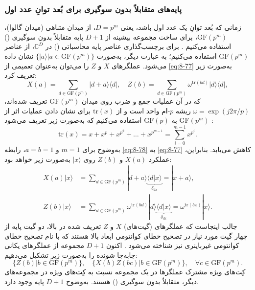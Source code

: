 \subsubsection{پایه‌های متقابلاً بدون سوگیری برای بُعد توانِ عدد اول}
\label{subsec:8-4-1-4}
زمانی که بُعد توانِ یک عدد اول باشد، یعنی $D = p^m$، از میدان متناهی (میدان گالوا)، $\mathrm{GF}(p^m)$، برای ساخت مجموعه بیشینه از $D + 1$ پایه متقابلاً بدون سوگیری () استفاده می‌کنیم \cite{8-78, 8-83, 8-84}. برای برچسب‌گذاری عناصر پایه محاسباتی () در $\mathbb{C}^D$، از عناصر $\mathrm{GF}(p^m)$ استفاده می‌کنیم؛ به عبارت دیگر،  به‌صورت $\{|a\rangle | a \in \mathrm{GF}(p^m)\}$ نشان داده می‌شود. عملگرهای $X$ و $Z$ را می‌توان به‌عنوان تعمیمی از \eqref{eq:8-77} به‌صورت زیر تعریف کرد:
\begin{equation}
	X(a) = \sum_{d \in \mathrm{GF}(p^m)} |d+a\rangle \langle d|, \quad Z(b) = \sum_{d \in \mathrm{GF}(p^m)} \omega^{\text{tr}(bd)} |d\rangle \langle d|,
	\label{eq:8-78}
\end{equation}
که در آن عملیات جمع و ضرب روی میدان $\mathrm{GF}(p^m)$ تعریف شده‌اند، $\omega = \exp(j2\pi/p)$ ریشه $p$-ام واحد است و از $\text{tr}(x)$ برای نشان دادن عملیات اثر از $\mathrm{GF}(p^m)$ به $\mathrm{GF}(p)$ استفاده می‌کنیم که به‌صورت زیر تعریف می‌شود \cite{8-5}:
\begin{equation}
	\text{tr}(x) = x + x^p + x^{p^2} + \dots + x^{p^{m-1}} = \sum_{i=0}^{m-1} x^{p^i}.
	\label{eq:8-79}
\end{equation}
به‌وضوح برای $m = 1$ و $a = b = 1$، رابطه \eqref{eq:8-78} به \eqref{eq:8-77} کاهش می‌یابد. بنابراین، عملکرد $X(a)$ و $Z(b)$ روی $|x\rangle$ به‌صورت زیر خواهد بود:
\begin{equation}
	\begin{aligned}
		X(a)|x\rangle &= \sum_{d \in \mathrm{GF}(p^m)} |d+a\rangle \underbrace{\langle d|x\rangle}_{\delta_{dx}} = |x+a\rangle, \\
		Z(b)|x\rangle &= \sum_{d \in \mathrm{GF}(p^m)} \omega^{\text{tr}(bd)} |d\rangle \underbrace{\langle d|x\rangle}_{\delta_{dx}} = \omega^{\text{tr}(bx)} |x\rangle.
	\end{aligned}
	\label{eq:8-80}
\end{equation}
جالب اینجاست که عملگرهای (گیت‌های) $X$ و $Z$ تعریف شده در بالا، دو گیت پایه از چهار گیت مورد نیاز در تصحیح خطای کوانتومی ابعاد بالا هستند که با نام تصحیح خطای کوانتومی غیرباینری نیز شناخته می‌شود \cite{8-5}. اکنون $D + 1$ مجموعه از عملگرهای یکانی جابه‌جا شونده را به‌صورت زیر تشکیل می‌دهیم:
\begin{equation}
	\{ Z(b) | b \in \mathrm{GF}(p^m) \}, \quad \{ X(b)Z(bc) | b \in \mathrm{GF}(p^m) \}, \quad \forall c \in \mathrm{GF}(p^m).
	\label{eq:8-81}
\end{equation}
کِت‌های ویژه مشترک عملگرها در یک مجموعه نسبت به کِت‌های ویژه در مجموعه‌های دیگر، متقابلاً بدون سوگیری () هستند. به‌وضوح $D+1$ پایه  وجود دارد.

